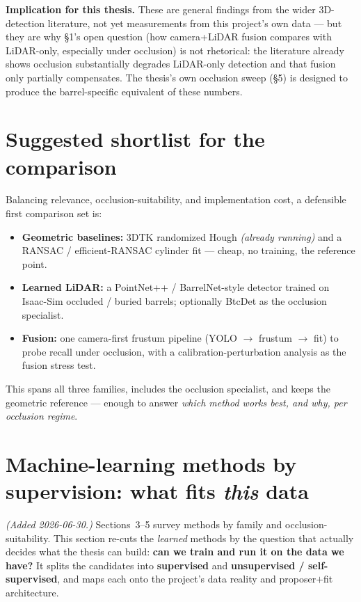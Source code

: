\documentclass[10pt,a4paper]{article}
\begin{document}
\noindent\textbf{Implication for this thesis.} These are general findings from the wider
3D-detection literature, not yet measurements from this project's own data --- but they
are why \S1's open question (how camera+LiDAR fusion compares with LiDAR-only,
especially under occlusion) is not rhetorical: the literature already shows occlusion
substantially degrades LiDAR-only detection and that fusion only partially compensates.
The thesis's own occlusion sweep (\S5) is designed to produce the barrel-specific
equivalent of these numbers.

\section{Suggested shortlist for the comparison}

Balancing relevance, occlusion-suitability, and implementation cost, a defensible first
comparison set is:

\begin{itemize}[leftmargin=1.4em,itemsep=2pt,topsep=2pt]
  \item \textbf{Geometric baselines:} 3DTK randomized Hough \emph{(already running)} and a
  RANSAC / efficient-RANSAC cylinder fit --- cheap, no training, the reference point.
  \item \textbf{Learned LiDAR:} a PointNet++ / BarrelNet-style detector trained on
  Isaac-Sim occluded / buried barrels; optionally BtcDet as the occlusion specialist.
  \item \textbf{Fusion:} one camera-first frustum pipeline (YOLO $\to$ frustum $\to$ fit)
  to probe recall under occlusion, with a calibration-perturbation analysis as the fusion
  stress test.
\end{itemize}

\noindent This spans all three families, includes the occlusion specialist, and keeps the
geometric reference --- enough to answer \emph{which method works best, and why, per
occlusion regime}.

\section{Machine-learning methods by supervision: what fits \emph{this} data}
\label{sec:mlsupervision}

\emph{(Added 2026-06-30.)} Sections~3--5 survey methods by family and occlusion-suitability.
This section re-cuts the \emph{learned} methods by the question that actually decides what
the thesis can build: \textbf{can we train and run it on the data we have?} It splits the
candidates into \textbf{supervised} and \textbf{unsupervised / self-supervised}, and maps
each onto the project's data reality and proposer$+$fit architecture.
\end{document}
